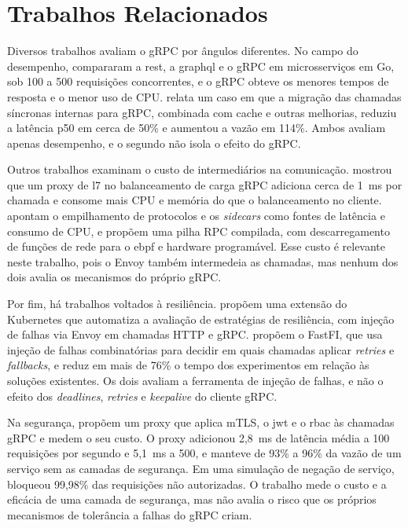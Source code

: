 \section{Trabalhos Relacionados}
\label{sec:trabalhos:relacionados}

Diversos trabalhos avaliam o gRPC por ângulos diferentes. No campo do desempenho,
 compararam a \gls{rest}, a \gls{graphql} e o gRPC em
microsserviços em Go,
sob 100 a 500 requisições concorrentes, e o gRPC obteve os menores tempos de resposta e o menor uso
de CPU.  relata um caso em que a migração das chamadas síncronas
internas para gRPC, combinada com cache e outras melhorias, reduziu a latência p50 em
cerca de 50\% e aumentou a vazão em 114\%. Ambos avaliam apenas desempenho, e o segundo não isola o
efeito do gRPC.

Outros trabalhos examinam o custo de intermediários na comunicação.
 mostrou que um proxy de \gls{l7} no balanceamento de
carga gRPC adiciona cerca de 1~ms por chamada e consome mais CPU e memória do que o balanceamento
no cliente.  apontam o empilhamento de protocolos e os
\textit{sidecars} como fontes de latência e consumo de CPU, e propõem uma pilha RPC compilada, com
descarregamento de funções de rede para o \gls{ebpf} e hardware programável. Esse custo é relevante
neste trabalho,
pois o Envoy também intermedeia as chamadas, mas nenhum dos dois avalia os mecanismos do próprio gRPC.

Por fim, há trabalhos voltados à resiliência.  propõem
uma extensão do Kubernetes que automatiza a avaliação de estratégias de resiliência, com injeção de
falhas via Envoy em chamadas HTTP e gRPC.  propõem o FastFI, que
usa injeção de falhas combinatórias para decidir em quais chamadas aplicar \textit{retries} e
\textit{fallbacks}, e reduz em mais de 76\% o tempo dos experimentos em relação às soluções
existentes. Os dois avaliam a ferramenta de injeção de falhas, e não o efeito dos
\textit{deadlines}, \textit{retries} e \textit{keepalive} do cliente gRPC.

Na segurança,  propõem um proxy que aplica mTLS, o \gls{jwt} e
o \gls{rbac} às
chamadas gRPC e medem o seu custo. O proxy adicionou 2,8~ms de latência média a 100 requisições por
segundo e 5,1~ms a 500, e manteve de 93\% a 96\% da vazão de um serviço sem as camadas de
segurança. Em uma simulação de negação de serviço, bloqueou 99,98\% das requisições não
autorizadas. O trabalho mede o custo e a eficácia de uma camada de segurança, mas não avalia o
risco que os próprios mecanismos de tolerância a falhas do gRPC criam.

